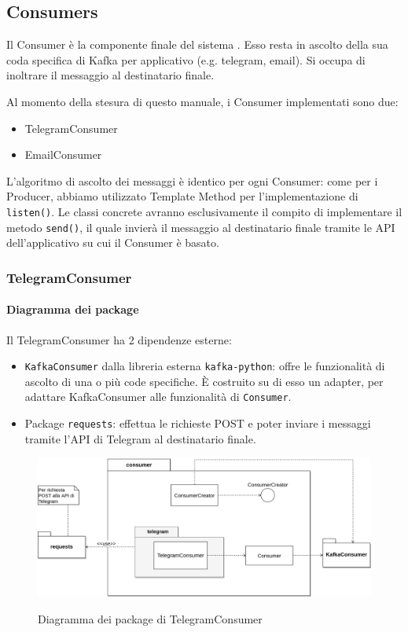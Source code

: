\subsection{Consumers}
Il Consumer è la componente finale del sistema \progetto. Esso resta in ascolto della sua coda specifica di Kafka per applicativo (e.g. telegram, email).
Si occupa di inoltrare il messaggio al destinatario finale.

Al momento della stesura di questo manuale, i Consumer implementati sono due:

\begin{itemize}
    \item TelegramConsumer
    \item EmailConsumer
\end{itemize}

L'algoritmo di ascolto dei messaggi è identico per ogni Consumer: come per i Producer, abbiamo utilizzato
Template Method per l'implementazione di \texttt{listen()}.
Le classi concrete avranno esclusivamente il compito di implementare il metodo \texttt{send()}, il quale invierà il messaggio
al destinatario finale tramite le API dell'applicativo su cui il Consumer è basato.


\subsubsection{TelegramConsumer}

\paragraph{Diagramma dei package}

Il TelegramConsumer ha 2 dipendenze esterne:
\begin{itemize}
    \item \texttt{KafkaConsumer} dalla libreria esterna \texttt{kafka-python}: offre le funzionalità di ascolto
        di una o più code specifiche. È costruito su di esso un adapter, per adattare KafkaConsumer alle funzionalità
        di \texttt{Consumer}.
    \item Package \texttt{requests}: effettua le richieste POST e poter inviare i messaggi tramite l'API di Telegram
        al destinatario finale.
\end{itemize}

\begin{figure}[H]
    \centering
    \includegraphics[width=\textwidth]{img/Package-TelegramConsumer.png}\\
    \caption{Diagramma dei package di TelegramConsumer}
\end{figure}


